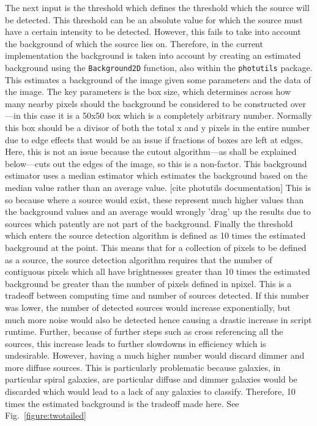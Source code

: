\documentclass[a4paper,fleqn,usenatbib]{mnras}
\begin{document}
The next input is the threshold which defines the threshold which the source will be detected. This threshold can be an absolute value for which the source must have a certain intensity to be detected. However, this fails to take into account the background of which the source lies on. Therefore, in the current implementation the background is taken into account by creating an estimated background using the \texttt{Background2D} function, also within the \texttt{photutils} package. This estimates a background of the image given some parameters and the data of the image. The key parameters is the box size, which determines across how many nearby pixels should the background be considered to be constructed over---in this case it is a 50x50 box which is a completely arbitrary number. Normally this box should be a divisor of both the total x and y pixels in the entire number due to edge effects that would be an issue if fractions of boxes are left at edges. Here, this is not an issue because the cutout algorithm---as shall be explained below---cuts out the edges of the image, so this is a non-factor. This background estimator uses a median estimator which estimates the background based on the median value rather than an average value. [cite photutils documentation] This is so because where a source would exist, these represent much higher values than the background values and an average would wrongly 'drag' up the results due to sources which patently are not part of the background. Finally the threshold which enters the source detection algorithm is defined as 10 times the estimated background at the point. This means that for a collection of pixels to be defined as a source, the source detection algorithm requires that the number of contiguous pixels which all have brightnesses greater than 10 times the estimated background be greater than the number of pixels defined in npixel. This is a tradeoff between computing time and number of sources detected. If this number was lower, the number of detected sources would increase exponentially, but much more noise would also be detected hence causing a drastic increase in script runtime. Further, because of further steps such as cross referencing all the sources, this increase leads to further slowdowns in efficiency which is undesirable. However, having a much higher number would discard dimmer and more diffuse sources. This is particularly problematic because galaxies, in particular spiral galaxies, are particular diffuse and dimmer galaxies would be discarded which would lead to a lack of any galaxies to classify. Therefore, 10 times the estimated background is the tradeoff made here. See Fig.~\ref{figure:twotailed}
\end{document}
